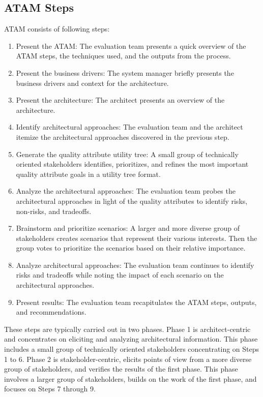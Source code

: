 \subsection{ATAM Steps}
\label{subsec:atamsteps}
ATAM consists of following steps:
\begin{enumerate}
    \item Present the ATAM: The evaluation team presents a quick overview of the ATAM steps, the techniques used, and the outputs from the process. 
    \item Present the business drivers: The system manager briefly presents the business drivers and context for the architecture.
    \item Present the architecture: The architect presents an overview of the architecture.
    \item Identify architectural approaches: The evaluation team and the architect itemize the architectural approaches discovered in the previous step. 
    \item Generate the quality attribute utility tree: A small group of technically oriented stakeholders identifies, prioritizes, and refines the most important quality attribute goals in a utility tree format.
    \item Analyze the architectural approaches: The evaluation team probes the architectural approaches in light of the quality attributes to identify risks, non-risks, and tradeoffs. 
    \item Brainstorm and prioritize scenarios: A larger and more diverse group of stakeholders creates scenarios that represent their various interests. Then the group votes to prioritize the scenarios based on their relative importance. 
    \item Analyze architectural approaches: The evaluation team continues to identify risks and tradeoffs while noting the impact of each scenario on the architectural approaches. 
    \item Present results: The evaluation team recapitulates the ATAM steps, outputs, and recommendations.
\end{enumerate}

These steps are typically carried out in two phases. Phase 1 is architect-centric and concentrates on eliciting and analyzing architectural information. This phase includes a small group of technically oriented stakeholders concentrating on Steps 1 to 6. Phase 2 is stakeholder-centric, elicits points of view from a more diverse group of stakeholders, and verifies the results of the first phase. This phase involves a larger group of stakeholders, builds on the work of the first phase, and focuses on Steps 7 through 9. \cite{Jones2001EvaluateStudy} 

